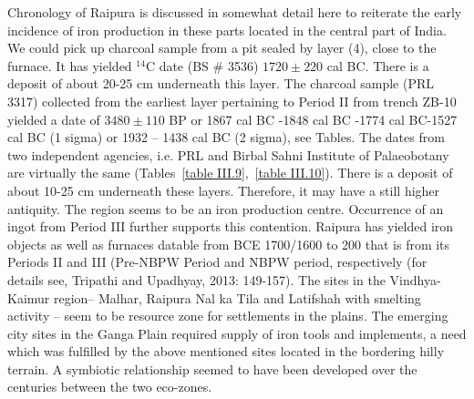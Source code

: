 Chronology of Raipura is discussed in somewhat detail here to reiterate the early incidence of iron production in these parts located in the central part of India. We could pick up charcoal sample from a pit sealed by layer (4), close to the furnace. It has yielded ${}^{14}$C date (BS \# 3536) $1720 \pm 220$ cal BC. There is a deposit of about 20-25 cm underneath this layer. The charcoal sample (PRL 3317) collected from the earliest layer pertaining to Period II from trench ZB-10 yielded a date of $3480\pm110$ BP or 1867 cal BC -1848 cal BC -1774 cal BC-1527 cal BC (1 sigma) or 1932 – 1438 cal BC (2 sigma), see Tables. The dates from two independent agencies, i.e. PRL and Birbal Sahni Institute of Palaeobotany are virtually the same (Tables~\ref{table III.9},~\ref{table III.10}). There is a deposit of about 10-25 cm underneath these layers. Therefore, it may have a still higher antiquity. The region seems to be an iron production centre. Occurrence of an ingot from Period III further supports this contention. Raipura has yielded iron objects as well as furnaces datable from BCE 1700/1600 to 200 that is from its Periods II and III (Pre-NBPW Period and NBPW period, respectively (for details see, Tripathi and Upadhyay, 2013: 149-157). The sites in the Vindhya-Kaimur region– Malhar, Raipura Nal ka Tila and Latifshah with smelting activity – seem to be resource zone for settlements in the plains. The emerging city sites in the Ganga Plain required supply of iron tools and implements, a need which was fulfilled by the above mentioned sites located in the bordering hilly terrain. A symbiotic relationship seemed to have been developed over the centuries between the two eco-zones. 

